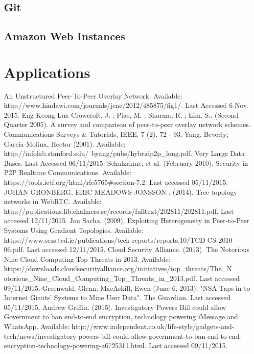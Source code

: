\documentclass[]{report}
\begin{document}
			\subsection{Git}
			\subsection{Amazon Web Instances}
		\section{Applications}

					
	\begin{thebibliography}{20}
		An Unstructured Peer-To-Peer Overlay Network. Available: http://www.hindawi.com/journals/jcnc/2012/485875/fig1/. Last Accessed 6 Nov. 2015.
		Eng Keong Lua Crowcroft, J. ; Pias, M. ; Sharma, R. ; Lim, S.. (Second Quarter 2005). A survey and comparison of peer-to-peer overlay network schemes. Communications Surveys \& Tutorials, IEEE. 7 (2), 72 - 93.
		Yang, Beverly; Garcia-Molina, Hector (2001). Available: http://infolab.stanford.edu/~byang/pubs/hybridp2p\_long.pdf. Very Large Data Bases. Last Accessed 06/11/2015.
		Schulzrinne, et al. (February 2010). Security in P2P Realtime Communications. Available: https://tools.ietf.org/html/rfc5765\#section-7.2. Last accessed 05/11/2015.
		JOHAN GRONBERG, ERIC MEADOWS-JONSSON . (2014). Tree topology networks in WebRTC. Available: http://publications.lib.chalmers.se/records/fulltext/202811/202811.pdf. Last accessed 12/11/2015.
		Jan Sacha. (2009). Exploiting Heterogeneity in Peer-to-Peer Systems Using Gradient Topologies. Available: https://www.scss.tcd.ie/publications/tech-reports/reports.10/TCD-CS-2010-06.pdf. Last accessed 12/11/2015.
		Cloud Security Alliance. (2013). The Notorious Nine Cloud Computing Top Threats in 2013. Available: https://downloads.cloudsecurityalliance.org/initiatives/top\_threats/The\_N\\otorious\_Nine\_Cloud\_Computing\_Top\_Threats\_in\_2013.pdf. Last accessed 09/11/2015.
		Greenwald, Glenn; MacAskill, Ewen (June 6, 2013). "NSA Taps in to Internet Giants' Systems to Mine User Data". The Guardian.  Last accessed 05/11/2015.
		Andrew Griffin. (2015). Investigatory Powers Bill could allow Government to ban end-to-end encryption, technology powering iMessage and WhatsApp. Available: http://www.independent.co.uk/life-style/gadgets-and-tech/news/investigatory-powers-bill-could-allow-government-to-ban-end-to-end-encryption-technology-powering-a6725311.html. Last accessed 09/11/2015.

\end{thebibliography}
\end{document}
